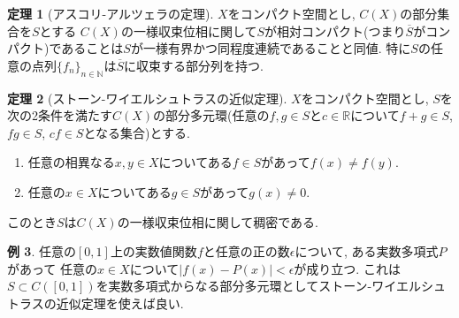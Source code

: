 \documentclass[dvipdfmx,a4paper,11pt]{article}
\newcommand{\R}{\mathbb{R}}
\newcommand{\N}{\mathbb{N}}
\theoremstyle{definition}
\newtheorem{thm}{定理}
\newtheorem{dfn}[thm]{定義}
\newtheorem{exa}[thm]{例}
\begin{document}
   \begin{tcolorbox}[
    colback = white,
    colframe = green!35!black,
    fonttitle = \bfseries,
    breakable = true]
    \begin{thm}[アスコリ-アルツェラの定理]
  $X$をコンパクト空間とし, $C(X)$の部分集合を$S$とする
 $C(X)$の一様収束位相に関して$S$が相対コンパクト(つまり$\overline{S}$がコンパクト)であることは$S$が一様有界かつ同程度連続であることと同値. 特に$S$の任意の点列$\{ f_n\}_{n \in \N}$は$\overline{S}$に収束する部分列を持つ.
  \end{thm}
  \end{tcolorbox}
  

  
     \begin{tcolorbox}[
    colback = white,
    colframe = green!35!black,
    fonttitle = \bfseries,
    breakable = true]
    \begin{thm}[ストーン-ワイエルシュトラスの近似定理]
  $X$をコンパクト空間とし, $S$を次の2条件を満たす$C(X)$の部分多元環(任意の$f,g \in S$と$c \in \R$について$f+g \in S$, $fg \in S$, $cf \in S$となる集合)とする.
  \begin{enumerate}
   \setlength{\parskip}{0cm} 
  \setlength{\itemsep}{0cm} 
  \item 任意の相異なる$x,y \in X$についてある$f \in S$があって$f(x) \neq f(y)$.
  \item 任意の$x \in X$についてある$g \in S$があって$g(x) \neq 0$.
  \end{enumerate}
このとき$S$は$C(X)$の一様収束位相に関して稠密である.
  \end{thm}
  \end{tcolorbox}
  \begin{exa}
  任意の$[0,1]$上の実数値関数$f$と任意の正の数$\epsilon$について, ある実数多項式$P$があって
  任意の$x \in X$について$|f(x) - P(x)| < \epsilon$が成り立つ. これは$S \subset C([0,1])$を実数多項式からなる部分多元環としてストーン-ワイエルシュトラスの近似定理を使えば良い.
  \end{exa}
  
\end{document}
